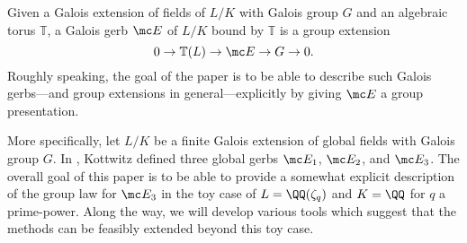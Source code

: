 
Given a Galois extension of fields of $L/K$ with Galois group $G$ and an algebraic torus $\mathbb T$, a Galois gerb $\mc E$ of $L/K$ bound by $\mathbb T$ is a group extension
\[0\to\mathbb T(L)\to\mc E\to G\to0.\]
Roughly speaking, the goal of the paper is to be able to describe such Galois gerbs---and group extensions in general---explicitly by giving $\mc E$ a group presentation.

More specifically, let $L/K$ be a finite Galois extension of global fields with Galois group $G$. In \cite{kottwitz}, Kottwitz defined three global gerbs $\mc E_1$, $\mc E_2$, and $\mc E_3$. The overall goal of this paper is to be able to provide a somewhat explicit description of the group law for $\mc E_3$ in the toy case of $L=\QQ(\zeta_q)$ and $K=\QQ$ for $q$ a prime-power. Along the way, we will develop various tools which suggest that the methods can be feasibly extended beyond this toy case.

